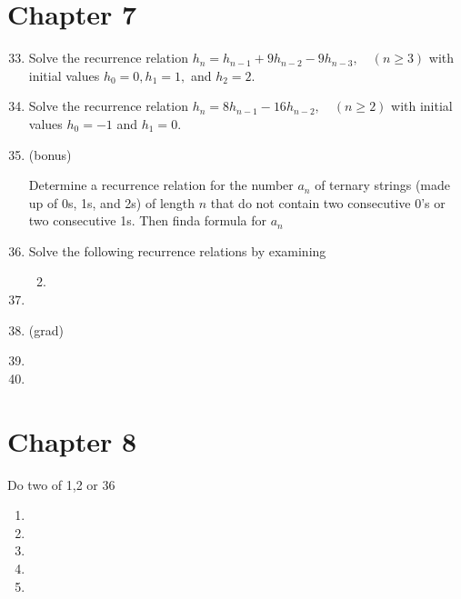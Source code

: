 \documentclass{article}
\begin{document}
\section*{Chapter 7}
\begin{enumerate}
  \setcounter{enumi}{32}
  \item
  Solve the recurrence relation $h_n=h_{n-1}+9h_{n-2}-9h_{n-3},\quad(n\ge3)$ with initial values $h_0=0,h_1=1,$ and $h_2=2$.
  \item
  Solve the recurrence relation $h_n=8h_{n-1}-16h_{n-2},\quad(n\ge2)$ with initial values $h_0=-1$ and $h_1=0$.
  \setcounter{enumi}{36}
  \item
  (bonus)

  Determine a recurrence relation for the number $a_n$ of ternary strings (made up of 0s, 1s, and 2s) of length $n$ that do not contain two consecutive 0's or two consecutive 1s. Then finda formula for $a_n$
  \item
  Solve the following recurrence relations by examining 
  \begin{enumerate}
    \setcounter{enumii}{1}
    \item
  \end{enumerate}
  \setcounter{enumi}{39}
  \item
  \item
  (grad)
  \setcounter{enumi}{43}
  \item
  \item
\end{enumerate}
\section*{Chapter 8}
Do two of 1,2 or 36
\begin{enumerate}
  \item
  \item
  \item
  \item
  \setcounter{enumi}{35}
  \item
\end{enumerate}
\end{document}
